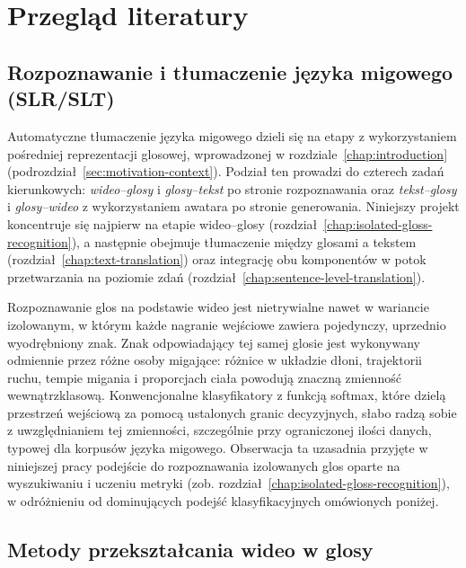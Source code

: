 
\section{Przegląd literatury}
\label{chap:related-work}

\subsection{Rozpoznawanie i tłumaczenie języka migowego (SLR/SLT)}
\label{sec:slr-slt-background}

Automatyczne tłumaczenie języka migowego dzieli się na etapy z wykorzystaniem
pośredniej reprezentacji glosowej, wprowadzonej w rozdziale~\ref{chap:introduction}
(podrozdział~\ref{sec:motivation-context}). Podział ten prowadzi do czterech zadań
kierunkowych: \emph{wideo--glosy} i \emph{glosy--tekst} po stronie rozpoznawania
oraz \emph{tekst--glosy} i \emph{glosy--wideo} z wykorzystaniem awatara po stronie
generowania. Niniejszy projekt koncentruje się najpierw na etapie wideo--glosy
(rozdział~\ref{chap:isolated-gloss-recognition}), a następnie obejmuje tłumaczenie
między glosami a tekstem (rozdział~\ref{chap:text-translation}) oraz integrację
obu komponentów w potok przetwarzania na poziomie zdań
(rozdział~\ref{chap:sentence-level-translation}).

Rozpoznawanie glos na podstawie wideo jest nietrywialne nawet w wariancie
izolowanym, w którym każde nagranie wejściowe zawiera pojedynczy, uprzednio
wyodrębniony znak. Znak odpowiadający tej samej glosie jest wykonywany odmiennie
przez różne osoby migające: różnice w układzie dłoni, trajektorii ruchu, tempie
migania i proporcjach ciała powodują znaczną zmienność wewnątrzklasową.
Konwencjonalne klasyfikatory z funkcją softmax, które dzielą przestrzeń wejściową
za pomocą ustalonych granic decyzyjnych, słabo radzą sobie z uwzględnianiem tej
zmienności, szczególnie przy ograniczonej ilości danych, typowej dla korpusów
języka migowego. Obserwacja ta uzasadnia przyjęte w niniejszej pracy podejście do
rozpoznawania izolowanych glos oparte na wyszukiwaniu i uczeniu metryki
(zob. rozdział~\ref{chap:isolated-gloss-recognition}), w odróżnieniu od dominujących
podejść klasyfikacyjnych omówionych poniżej.

\subsection{Metody przekształcania wideo w glosy}
\label{sec:video-to-gloss-methods}

